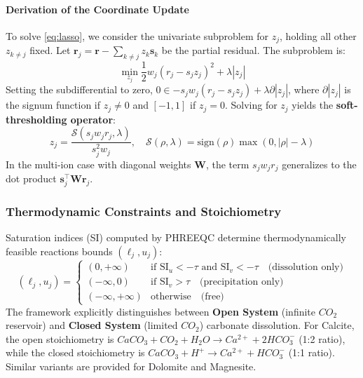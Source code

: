 \documentclass[12pt,a4paper]{article}
\theoremstyle{plain}
\theoremstyle{definition}
\theoremstyle{remark}
\begin{document}
\paragraph{Derivation of the Coordinate Update}
To solve \eqref{eq:lasso}, we consider the univariate subproblem for $z_j$, holding all other $z_{k \neq j}$ fixed. Let $\mathbf{r}_j = \mathbf{r} - \sum_{k \neq j} z_k \mathbf{s}_k$ be the partial residual. The subproblem is:
\begin{equation}
	\min_{z_j} \frac{1}{2} w_j (r_j - s_j z_j)^2 + \lambda |z_j|
\end{equation}
Setting the subdifferential to zero, $0 \in -s_j w_j (r_j - s_j z_j) + \lambda \partial |z_j|$, where $\partial |z_j|$ is the signum function if $z_j \neq 0$ and $[-1, 1]$ if $z_j = 0$. Solving for $z_j$ yields the \textbf{soft-thresholding operator}:
\begin{equation}\label{eq:soft_thresh}
	z_j = \frac{\mathcal{S}(s_j w_j r_j, \lambda)}{s_j^2 w_j}, \quad \mathcal{S}(\rho, \lambda) = \text{sign}(\rho) \max(0, |\rho| - \lambda)
\end{equation}
In the multi-ion case with diagonal weights $\mathbf{W}$, the term $s_j w_j r_j$ generalizes to the dot product $\mathbf{s}_j^\top \mathbf{W} \mathbf{r}_j$.

\subsubsection{Thermodynamic Constraints and Stoichiometry}
Saturation indices (SI) computed by PHREEQC determine thermodynamically feasible reactions bounds $(\ell_j, u_j)$:
\begin{equation}\label{eq:si_bounds}
	(\ell_j, u_j) = \begin{cases}
		(0, +\infty)       & \text{if } \text{SI}_u < -\tau \text{ and } \text{SI}_v < -\tau \quad \text{(dissolution only)} \\
		(-\infty, 0)       & \text{if } \text{SI}_v > \tau \quad \text{(precipitation only)}                                 \\
		(-\infty, +\infty) & \text{otherwise} \quad \text{(free)}
	\end{cases}
\end{equation}
The framework explicitly distinguishes between \textbf{Open System} (infinite $CO_2$ reservoir) and \textbf{Closed System} (limited $CO_2$) carbonate dissolution. For Calcite, the open stoichiometry is $CaCO_3 + CO_2 + H_2O \to Ca^{2+} + 2HCO_3^-$ (1:2 ratio), while the closed stoichiometry is $CaCO_3 + H^+ \to Ca^{2+} + HCO_3^-$ (1:1 ratio). Similar variants are provided for Dolomite and Magnesite.
\end{document}
